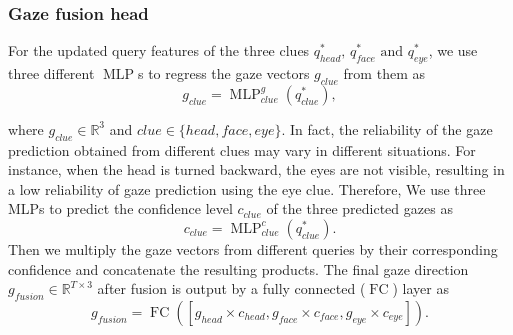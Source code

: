 \documentclass[journal]{IEEEtran}
\begin{document}
\subsubsection{\textbf{Gaze fusion head}}
For the updated query features of the three clues $q^{*}_{head}\text{, }q^{*}_{face}\text{ and }q^{*}_{eye}$, we use three different $\operatorname{MLP}$s to regress the gaze vectors $g_{clue}$ from them as
\begin{equation}
g_{clue}=\operatorname{MLP}^g_{clue}(q^{*}_{clue}),
\end{equation}

where $g_{clue}\in \mathbb{R}^{3}$ and $clue \in \{ head, face, eye \}$. In fact, the reliability of the gaze prediction obtained from different clues may vary in different situations. For instance, when the head is turned backward, the eyes are not visible, resulting in a low reliability of gaze prediction using the eye clue. Therefore, We use three MLPs to predict the confidence level $c_{clue}$ of the three predicted gazes as
\begin{equation}
    c_{clue}=\operatorname{MLP}^c_{clue}(q^{*}_{clue}).
\end{equation}
Then we multiply the gaze vectors from different queries by their corresponding confidence and concatenate the resulting products.
The final gaze direction $g_{fusion}\in \mathbb{R}^{T\times 3}$ after fusion is output by a fully connected ($\operatorname{FC}$) layer as
\begin{equation}
    g_{fusion}=\operatorname{FC}([g_{head}\times c_{head},g_{face}\times c_{face},g_{eye}\times c_{eye}]).
\end{equation}
\end{document}
